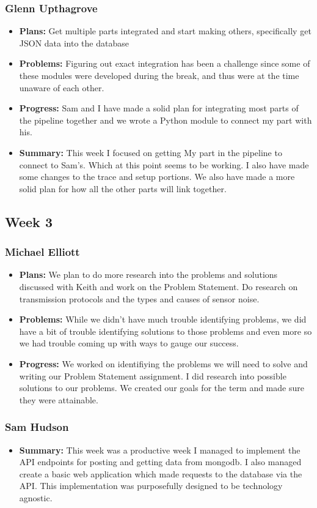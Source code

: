 \documentclass[onecolumn, draftclsnofoot,10pt, compsoc]{IEEEtran}
\begin{document}
\subsubsection{Glenn Upthagrove}
\begin {itemize}
 \item \textbf{Plans: }Get multiple parts integrated and start making others, specifically get JSON data into the database 
 \item \textbf{Problems: }Figuring out exact integration has been a challenge since some of these modules were developed during the break, and thus were at the time unaware of each other. 
 \item \textbf{Progress: }Sam and I have made a solid plan for integrating most parts of the pipeline together and we wrote a Python module to connect my part with his.
 \item \textbf{Summary: }This week I focused on getting My part in the pipeline to connect to Sam's. Which at this point seems to be working. I also have made some changes to the trace and setup portions. We also have made a more solid plan for how all the other parts will link together.  
\end {itemize}
\subsection {Week 3}
\subsubsection{Michael Elliott}
\begin {itemize}
\item \textbf{Plans: }
  We plan to do more research into the problems and solutions discussed with Keith and work on the Problem Statement. Do research on transmission protocols and the types and causes of sensor noise.
\item \textbf{Problems: }
  While we didn't have much trouble identifying problems, we did have a bit of trouble identifying solutions to those problems and even more so we had trouble coming up with ways to gauge our success.
\item \textbf{Progress: }
  We worked on identifiying the problems we will need to solve and writing our Problem Statement assignment. I did research into possible solutions to our problems. We created our goals for the term and made sure they were attainable.
\end {itemize}
\subsubsection{Sam Hudson}
\begin {itemize}
\item \textbf{Summary: }This week was a productive week I managed to implement the API endpoints for posting and getting data from mongodb. I also managed create a basic web application which made requests to the database via the API. This implementation was purposefully designed to be technology agnostic.
\end {itemize}
\end{document}
